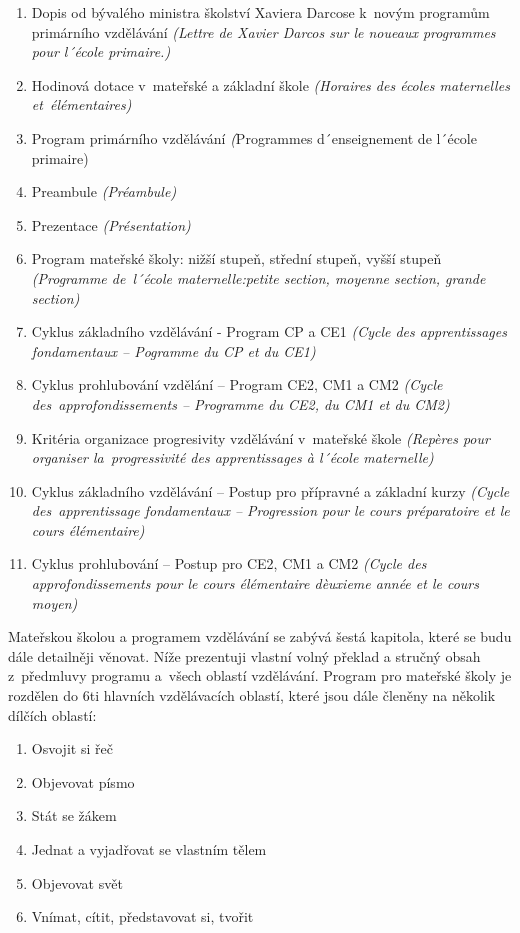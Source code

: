 	\begin{enumerate}[1]
		\item Dopis od bývalého ministra školství Xaviera Darcose k novým programům primárního vzdělávání \textit{(Lettre de Xavier Darcos sur le noueaux programmes pour l´école primaire.)}
		\item Hodinová dotace v mateřské a základní škole \textit{(Horaires des écoles maternelles et élémentaires)}
		\item Program primárního vzdělávání \textit({Programmes d´enseignement  de l´école primaire)}
		\item Preambule \textit{(Préambule)}
		\item Prezentace \textit{(Présentation)}
		\item Program mateřské školy: nižší stupeň, střední stupeň, vyšší stupeň \textit{(Programme de l´école maternelle:petite section, moyenne section, grande section)}
		\item Cyklus základního vzdělávání - Program CP a CE1 \textit{(Cycle des apprentissages fondamentaux – Pogramme du CP et du CE1)}
		\item Cyklus prohlubování vzdělání – Program CE2, CM1 a CM2 \textit{(Cycle des approfondissements – Programme du CE2, du CM1 et du CM2)}
		\item Kritéria organizace progresivity vzdělávání v mateřské škole \textit{(Repères pour organiser la progressivité des apprentissages à l´école maternelle)}
		\item Cyklus základního vzdělávání – Postup pro přípravné a základní kurzy \textit{(Cycle des apprentissage fondamentaux – Progression pour le cours préparatoire et le cours élémentaire)}
		\item Cyklus prohlubování – Postup pro CE2, CM1 a CM2 \textit{(Cycle des approfondissements pour le cours élémentaire dèuxieme année et le cours moyen)}
	\end{enumerate}


	Mateřskou školou a programem vzdělávání se zabývá šestá kapitola, které se budu dále detailněji věnovat. Níže prezentuji vlastní volný překlad a stručný obsah z předmluvy programu a všech oblastí vzdělávání.
	Program pro mateřské školy je rozdělen do 6ti hlavních vzdělávacích oblastí, které jsou dále členěny na několik dílčích oblastí:


	\begin{enumerate}[1]
		\item Osvojit si řeč 
		\item Objevovat písmo 
		\item Stát se žákem 
		\item Jednat a vyjadřovat se vlastním tělem 
		\item Objevovat svět
		\item Vnímat, cítit, představovat si, tvořit
	\end{enumerate}

